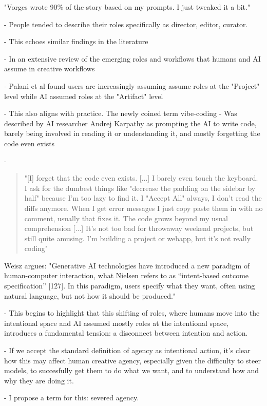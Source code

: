 "Vorges wrote 90\% of the story based on my prompts. I just tweaked it a bit."


- People tended to describe their roles specifically as director, editor, curator.

- This echoes similar findings in the literature

- In an extensive review of the emerging roles and workflows that humans and AI assume in creative workflows

- Palani et al \cite{Palani2024-on} found users are increasingly assuming assume roles at the "Project" level while AI assumed roles at the "Artifact" level

- This also aligns with practice. The newly coined term vibe-coding
- Was described by AI researcher Andrej Karpathy as prompting the AI to write code, barely being involved in reading it or understanding it, and mostly forgetting the code even exists

- \begin{quote}
"[I] forget that the code even exists. [...] I barely even touch the keyboard. I ask for the dumbest things like "decrease the padding on the sidebar by half" because I'm too lazy to find it. I "Accept All" always, I don't read the diffs anymore. When I get error messages I just copy paste them in with no comment, usually that fixes it. The code grows beyond my usual comprehension [...] It's not too bad for throwaway weekend projects, but still quite amusing. I'm building a project or webapp, but it's not really coding"
\end{quote}

Weisz argues: "Generative AI technologies have introduced a new paradigm of human-computer interaction, what Nielsen refers to as “intent-based outcome specification” [127]. In this paradigm, users specify what they want, often using natural language, but not how it should be produced."

- This begins to highlight that this shifting of roles, where humans move into the intentional space and AI assumed mostly roles at the intentional space, introduces a fundamental tension: a disconnect between intention and action.

- If we accept the standard definition of agency as intentional action, it's clear how this may affect human creative agency, especially given the difficulty to steer models, to succesfully get them to do what we want, and to understand how and why they are doing it. 

- I propose a term for this: severed agency. 

